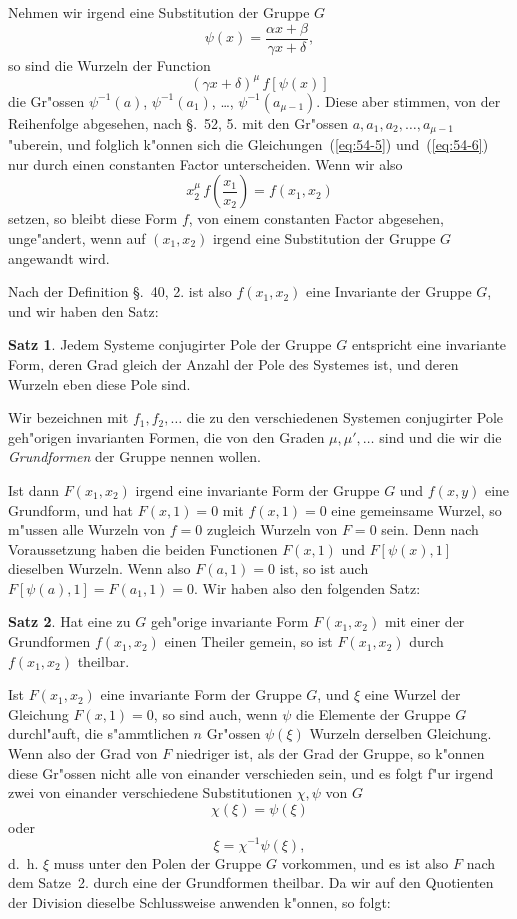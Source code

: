 \documentclass[12pt,a4paper]{article}
\theoremstyle{definition}
\newtheorem*{satz}{Satz}
\begin{document}
Nehmen wir irgend eine Substitution der Gruppe $G$
\[
\psi(x) = \frac{\alpha x + \beta}{\gamma x + \delta},
\]
so sind die Wurzeln der Function
\begin{equation}\label{eq:54-6}
(\gamma x + \delta)^{\mu}\,f[\psi(x)]
\end{equation}
die Gr"ossen $\psi^{-1}(a)$, $\psi^{-1}(a_1)$, \ldots, $\psi^{-1}(a_{\mu-1})$. Diese aber stimmen, von der Reihenfolge abgesehen, nach \S.~52, 5. mit den Gr"ossen $a, a_1, a_2, \ldots, a_{\mu-1}$ "uberein, und folglich k"onnen sich die Gleichungen~(\ref{eq:54-5}) und~(\ref{eq:54-6}) nur durch einen constanten Factor unterscheiden. Wenn wir also
\begin{equation}\label{eq:54-7}
x_2^{\mu}\,f\!\left(\frac{x_1}{x_2}\right) = f(x_1, x_2)
\end{equation}
setzen, so bleibt diese Form $f$, von einem constanten Factor abgesehen, unge"andert, wenn auf $(x_1, x_2)$ irgend eine Substitution der Gruppe $G$ angewandt wird.

Nach der Definition \S.~40, 2. ist also $f(x_1, x_2)$ eine Invariante der Gruppe $G$, und wir haben den Satz:

\begin{satz}
Jedem Systeme conjugirter Pole der Gruppe $G$ entspricht eine invariante Form, deren Grad gleich der Anzahl der Pole des Systemes ist, und deren Wurzeln eben diese Pole sind.
\end{satz}

Wir bezeichnen mit $f_1, f_2, \ldots$ die zu den verschiedenen Systemen conjugirter Pole geh"origen invarianten Formen, die von den Graden $\mu, \mu', \ldots$ sind und die wir die \emph{Grundformen} der Gruppe nennen wollen.

Ist dann $F(x_1, x_2)$ irgend eine invariante Form der Gruppe $G$ und $f(x, y)$ eine Grundform, und hat $F(x, 1) = 0$ mit $f(x, 1) = 0$ eine gemeinsame Wurzel, so m"ussen alle Wurzeln von $f = 0$ zugleich Wurzeln von $F = 0$ sein. Denn nach Voraussetzung haben die beiden Functionen $F(x, 1)$ und $F[\psi(x), 1]$ dieselben Wurzeln. Wenn also $F(a, 1) = 0$ ist, so ist auch $F[\psi(a), 1] = F(a_1, 1) = 0$. Wir haben also den folgenden Satz:

\begin{satz}
Hat eine zu $G$ geh"orige invariante Form $F(x_1, x_2)$ mit einer der Grundformen $f(x_1, x_2)$ einen Theiler gemein, so ist $F(x_1, x_2)$ durch $f(x_1, x_2)$ theilbar.
\end{satz}

Ist $F(x_1, x_2)$ eine invariante Form der Gruppe $G$, und $\xi$ eine Wurzel der Gleichung $F(x, 1) = 0$, so sind auch, wenn $\psi$ die Elemente der Gruppe $G$ durchl"auft, die s"ammtlichen $n$ Gr"ossen $\psi(\xi)$ Wurzeln derselben Gleichung. Wenn also der Grad von $F$ niedriger ist, als der Grad der Gruppe, so k"onnen diese Gr"ossen nicht alle von einander verschieden sein, und es folgt f"ur irgend zwei von einander verschiedene Substitutionen $\chi, \psi$ von $G$
\[
\chi(\xi) = \psi(\xi)
\]
oder
\[
\xi = \chi^{-1}\psi(\xi),
\]
d.~h. $\xi$ muss unter den Polen der Gruppe $G$ vorkommen, und es ist also $F$ nach dem Satze~2. durch eine der Grundformen theilbar. Da wir auf den Quotienten der Division dieselbe Schlussweise anwenden k"onnen, so folgt:
\end{document}

